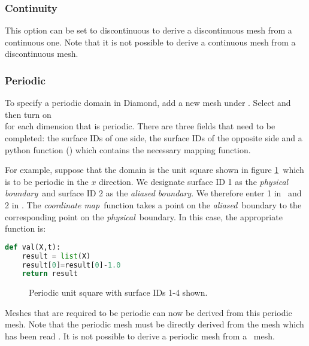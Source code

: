 \subsubsection{Continuity}

This option can be set to discontinuous to derive a discontinuous mesh from
a continuous one. Note that it is not possible to derive a continuous mesh
from a discontinuous mesh.

\subsubsection{Periodic}\label{Sect:periodic}

To specify a periodic domain in Diamond, add a new mesh under
.  Select \onlypdf\linebreak
{} and then turn
on \onlypdf\\
 for each dimension
that is periodic. There are three fields that need to be completed: the
surface IDs of one side, the surface IDs of the opposite side and a python
function () which contains the necessary mapping
function.

For example, suppose that the domain is the unit square shown in figure
\ref{fig:periodic}\ which is to be periodic in the $x$ direction. We
designate surface ID 1 as the \emph{physical boundary}\ and surface ID 2 as the
\emph{aliased boundary}. We therefore enter 1 in
\ and 2 in
. The \emph{coordinate map}\ function
takes a point on the \emph{aliased}\ boundary to the corresponding point on
the \emph{physical}\ boundary. In this case, the appropriate function is:
\begin{lstlisting}[language=Python]
def val(X,t):
    result = list(X)
    result[0]=result[0]-1.0
    return result
\end{lstlisting}

\begin{figure}[ht]
  \centering
  \caption{Periodic unit square with surface IDs 1-4 shown.}
  \label{fig:periodic}
\end{figure}

Meshes that are required to be periodic can now be derived from this
periodic mesh. Note that the periodic mesh must be directly derived from the
mesh which has been read . It is not possible to derive a
periodic mesh from a \ mesh.

